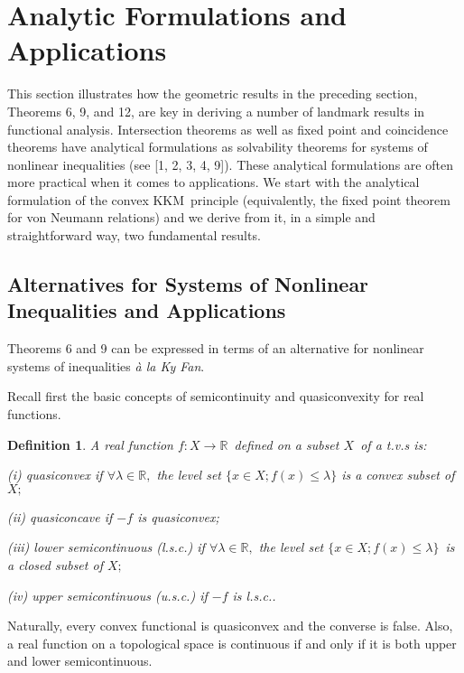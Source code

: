 \documentclass{article}
\newtheorem{definition}[theorem]{Definition}
\begin{document}
\section{Analytic Formulations and Applications}

This section illustrates how the geometric results in the preceding section,
Theorems 6, 9, and 12, are key in deriving a number of landmark results in
functional analysis. Intersection theorems as well as fixed point and
coincidence theorems have analytical formulations as solvability theorems
for systems of nonlinear inequalities (see [1, 2, 3, 4, 9]). These
analytical formulations are often more practical when it comes to
applications. We start with the analytical formulation of the convex KKM\
principle (equivalently, the fixed point theorem for von Neumann relations)
and we derive from it, in a simple and straightforward way, two fundamental
results.\bigskip

\subsection{Alternatives for Systems of Nonlinear Inequalities and
Applications}

Theorems 6 and 9 can be expressed in terms of an alternative for nonlinear
systems of inequalities \textit{\`{a} la Ky Fan}.

Recall first the basic concepts of semicontinuity and quasiconvexity for
real functions.\bigskip

\begin{definition}
\textit{A real function }$f:X\longrightarrow 
\mathbb{R}
$\textit{\ defined on a subset }$X$\textit{\ of a t.v.s is:}

(i) \textit{quasiconvex} if $\forall \lambda \in 
\mathbb{R}
,$ the level set $\{x\in X;f(x)\leq \lambda \}$ is a convex subset of $X;$

(ii) \textit{quasiconcave} if $-f$ is quasiconvex;

(iii) \textit{lower semicontinuous} \textit{(l.s.c.) }if $\forall \lambda
\in 
\mathbb{R}
,$ the level set $\{x\in X;f(x)\leq \lambda \}$\textit{\ }is a closed subset
of $X;$

(iv) \textit{upper semicontinuous} \textit{(u.s.c.) }if $-f$ is
l.s.c..\bigskip
\end{definition}

Naturally, every convex functional is quasiconvex and the converse is false.
Also, a real function on a topological space is continuous if and only if it
is both upper and lower semicontinuous.
\end{document}
